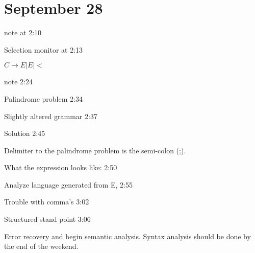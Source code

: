 \documentclass[11pt]{article}
\begin{document}
\section {September 28}
note at 2:10

Selection monitor  at 2:13


$C\to E | E | <$

note 2:24

Palindrome problem 2:34

Slightly altered grammar 2:37

Solution 2:45

Delimiter to the palindrome problem is the semi-colon (;).

What the expression looks like: 2:50


Analyze language generated from E, 2:55

Trouble with comma's 3:02

Structured stand point 3:06


Error recovery and begin semantic analysis.  Syntax analysis should be done by the end of the weekend.  


 




 
\end{document}
